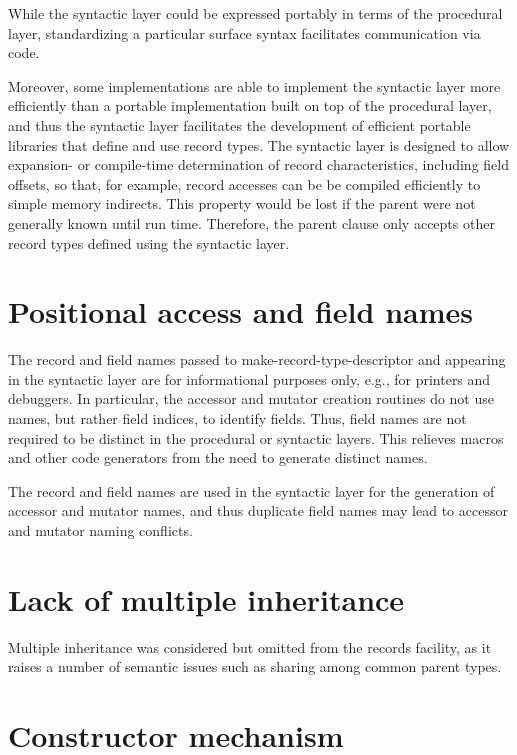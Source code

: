 \documentclass[twoside,twocolumn]{algol60}
\begin{document}
While the syntactic layer could be expressed portably in terms of the
procedural layer, standardizing a particular surface syntax
facilitates communication via code.

Moreover, some implementations are able to implement the syntactic
layer more efficiently than
a portable implementation built on top of the procedural layer, and
thus the syntactic layer facilitates the development of efficient portable libraries
that define and use record types.  The syntactic layer is designed to
allow expansion- or compile-time determination of record
characteristics, including field offsets, so that, for example, record
accesses can be be compiled efficiently to simple memory indirects.
This property would be lost if the parent were not generally known
until run time.  Therefore, the {\cf parent} clause only accepts
other record types defined using the syntactic layer.

\section{Positional access and field names}

The record and field names passed to {\cf make-record-type-descriptor}
and appearing in the syntactic layer are for informational purposes
only, e.g., for printers and debuggers.  In particular, the accessor
and mutator creation routines do not use names, but rather field
indices, to identify fields.
Thus, field names are not required to be distinct in the procedural or
syntactic layers.  This relieves macros and other code generators from
the need to generate distinct names.

The record and field names are used in the syntactic layer for the
generation of accessor and mutator names, and thus duplicate field names
may lead to accessor and mutator naming conflicts.

\section{Lack of multiple inheritance}

Multiple inheritance was considered but omitted from the records
facility, as it raises a number of semantic issues such as sharing
among common parent types.

\section{Constructor mechanism}
\end{document}

